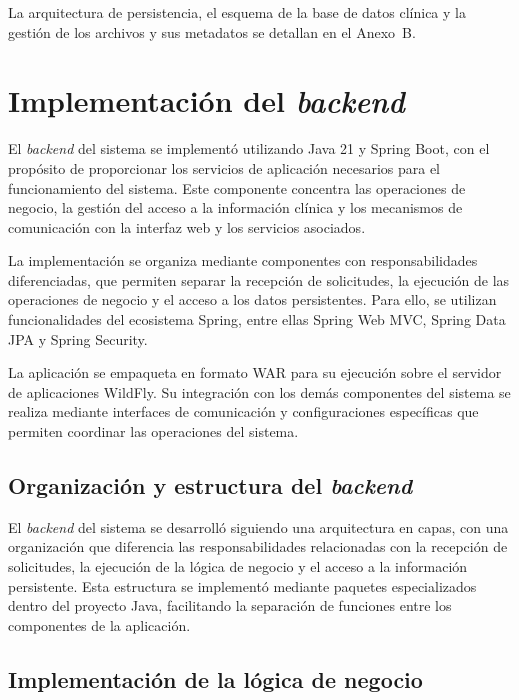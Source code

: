 \begin{nuevotexto}
La arquitectura de persistencia, el esquema de la base de datos clínica y la gestión de los archivos y sus metadatos se detallan en el Anexo~B.
\end{nuevotexto}

\section{Implementación del \textit{backend}}

El \textit{backend} del sistema se implementó utilizando Java 21
y Spring Boot, con el propósito de proporcionar los
servicios de aplicación necesarios para el funcionamiento
del sistema. Este componente concentra las operaciones
de negocio, la gestión del acceso a la información
clínica y los mecanismos de comunicación con la
interfaz web y los servicios asociados.

La implementación se organiza mediante componentes
con responsabilidades diferenciadas, que permiten
separar la recepción de solicitudes, la ejecución
de las operaciones de negocio y el acceso a los
datos persistentes. Para ello, se utilizan
funcionalidades del ecosistema Spring, entre ellas
Spring Web MVC, Spring Data JPA y Spring Security.

La aplicación se empaqueta en formato WAR para
su ejecución sobre el servidor de aplicaciones
WildFly. Su integración con los demás componentes
del sistema se realiza mediante interfaces de
comunicación y configuraciones específicas
que permiten coordinar las operaciones del sistema.

\subsection{Organización y estructura del \textit{backend}}

El \textit{backend} del sistema se desarrolló siguiendo una
arquitectura en capas, con una organización que
diferencia las responsabilidades relacionadas con
la recepción de solicitudes, la ejecución de la
lógica de negocio y el acceso a la información
persistente. Esta estructura se implementó mediante
paquetes especializados dentro del proyecto Java,
facilitando la separación de funciones entre los
componentes de la aplicación.

\subsection{Implementación de la lógica de negocio}

